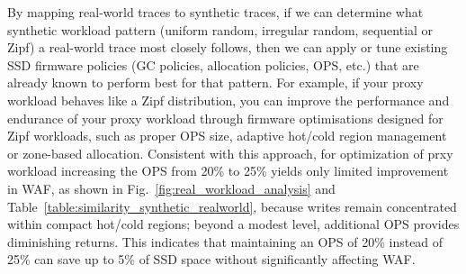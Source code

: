 \documentclass{ieeeaccess}
\begin{document}
By mapping real-world traces to synthetic traces, if we can determine what synthetic workload pattern (uniform random, irregular random, sequential or Zipf) a real-world trace most closely follows, then we can apply or tune existing SSD firmware policies (GC policies, allocation policies, OPS, etc.) that are already known to perform best for that pattern. For example, if your proxy workload behaves like a Zipf distribution, you can improve the performance and endurance of your proxy workload through firmware optimisations designed for Zipf workloads, such as proper OPS size, adaptive hot\slash cold region management\cite{hot-cold} or zone-based allocation\cite{zone-ssd}\cite{zonedssd-atc21}. Consistent with this approach, for optimization of prxy workload increasing the OPS from 20\% to 25\% yields only limited improvement in WAF, as shown in Fig.~\ref{fig:real_workload_analysis} and Table~\ref{table:similarity_synthetic_realworld}, because writes remain concentrated within compact hot\slash cold regions\cite{hot-cold}; beyond a modest level, additional OPS provides diminishing returns. 
This indicates that maintaining an OPS of 20\% instead of 25\% can save up to 5\% of SSD space without significantly affecting WAF.
\end{document}
